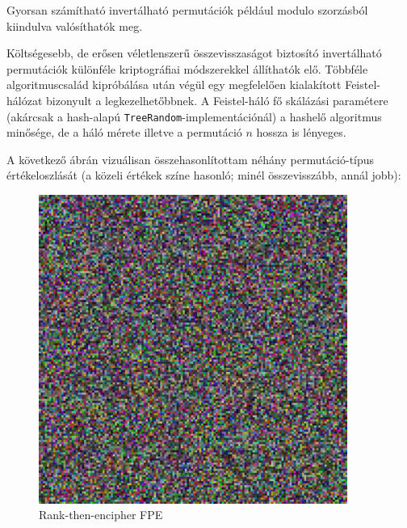 \documentclass[
    parspace,
    noindent,
    nohyp,
]{elteiktdk}[2023/04/10]
\begin{document}
Gyorsan számítható invertálható permutációk például modulo szorzásból kiindulva valósíthatók meg.

Költségesebb, de erősen véletlenszerű összevisszaságot biztosító invertálható permutációk
különféle kriptográfiai módszerekkel állíthatók elő.
Többféle algoritmuscsalád kipróbálása után
végül egy megfelelően kialakított Feistel-hálózat bizonyult a legkezelhetőbbnek.
A Feistel-háló fő skálázási paramétere (akárcsak a hash-alapú \texttt{TreeRandom}-implementációnál)
a hashelő algoritmus minősége,
de a háló mérete illetve a permutáció $n$ hossza is lényeges.

A következő ábrán vizuálisan összehasonlítottam néhány permutáció-típus értékeloszlását
(a közeli értékek színe hasonló; minél összevisszább, annál jobb):

\begin{figure}[H]
  \centering
  \hspace*{\fill}
  \begin{minipage}[b]{0.45\textwidth}
    \centering
    \includegraphics[width=0.9\textwidth]{image/permutation-fpe1.png}
    \caption{Rank-then-encipher FPE\protect\cite{Bellare2009FormatPreservingE}}
  \end{minipage}
  \hspace*{\fill}
  \begin{minipage}[b]{0.45\textwidth}
    \centering

\end{minipage}
\end{figure}
\end{document}
